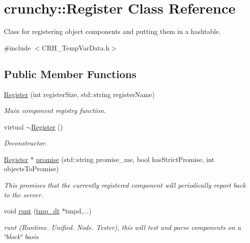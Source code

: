 \hypertarget{classcrunchy_1_1_register}{}\section{crunchy\+:\+:Register Class Reference}
\label{classcrunchy_1_1_register}


Class for registering object components and putting them in a hashtable.  




{\ttfamily \#include $<$C\+R\+H\+\_\+\+Temp\+Var\+Data.\+h$>$}

\subsection*{Public Member Functions}
\begin{DoxyCompactItemize}
\item 
\hyperlink{classcrunchy_1_1_register_a763cad20437e64d7e9d5558308c68419}{Register} (int register\+Size, std\+::string register\+Name)
\begin{DoxyCompactList}\small\item\em Main component registry function. \end{DoxyCompactList}\item 
virtual \hyperlink{classcrunchy_1_1_register_aca2c03eb24beba0b762db96f5471299c}{$\sim$\+Register} ()
\begin{DoxyCompactList}\small\item\em Deconstructor. \end{DoxyCompactList}\item 
\hyperlink{classcrunchy_1_1_register}{Register} $\ast$ \hyperlink{classcrunchy_1_1_register_a79c811f0a0c0150b2bf12788963e1012}{promise} (std\+::string promise\+\_\+me, bool has\+Strict\+Promise, int objects\+To\+Promise)
\begin{DoxyCompactList}\small\item\em This promises that the currently registered component will periodically report back to the server. \end{DoxyCompactList}\item 
void \hyperlink{classcrunchy_1_1_register_a3cc81983d4be4f35dc219dda5b890624}{runt} (\hyperlink{structtmp__dt}{tmp\+\_\+dt} $\ast$tmpd,...)
\begin{DoxyCompactList}\small\item\em runt (Runtime. Unified. Node. Tester), this will test and parse components on a \char`\"{}block\char`\"{} basis \end{DoxyCompactList}\item 

\end{DoxyCompactItemize}
